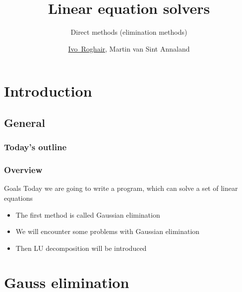 \documentclass[11pt,table,final,xcolor={usenames,dvipsnames,table}]{beamer}
\title{Linear equation solvers}
\subtitle{Direct methods (elimination methods)}
\author[I.~Roghair]{\underline{Ivo~Roghair}, Martin van Sint Annaland}
\institute[SPI]{{Chemical Process Intensification,\\
  Eindhoven University of Technology}}
\date
\begin{document}


\frame[plain]{
  \titlepage
}
\section{Introduction}
\subsection*{General}
\begin{frame}[label=contents]
  \frametitle{Today's outline}
\end{frame}

\begin{frame}
  \frametitle{Overview}
  \begin{block}{Goals}
    Today we are going to write a program, which can solve a set of linear equations
    \begin{itemize}
      \item The first method is called Gaussian elimination
      \item We will encounter some problems with Gaussian elimination
      \item Then LU decomposition will be introduced
  \end{itemize}
  \end{block}
\end{frame}

\section{Gauss elimination}
\end{document}
